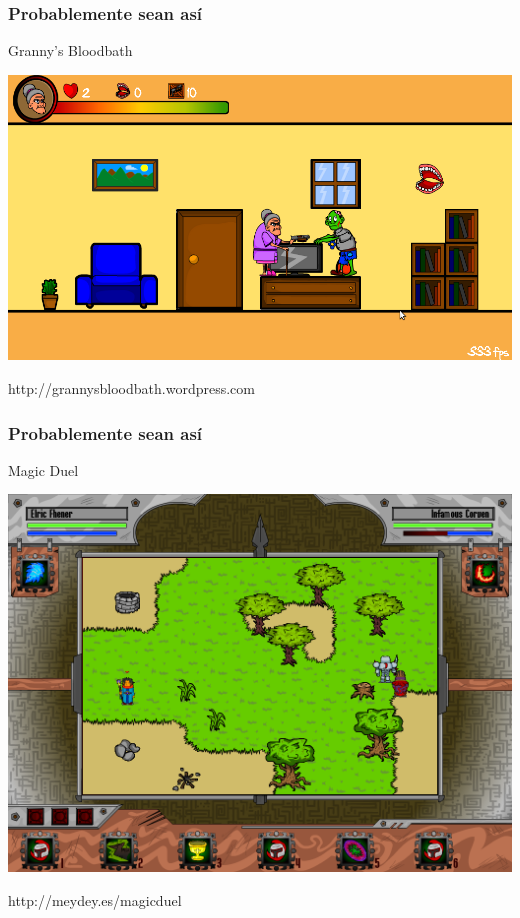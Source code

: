 \begin{frame}
	\frametitle{Probablemente sean así}

	\begin{center}
	Granny's Bloodbath
	
	    \includegraphics[scale=0.26]{img/grannysbloodbath.png}
	    
	http://grannysbloodbath.wordpress.com
	\end{center}
\end{frame}

\begin{frame}
	\frametitle{Probablemente sean así}

	\begin{center}
	Magic Duel
	
	    \includegraphics[scale=0.22]{img/magicduel.png}
	    
	http://meydey.es/magicduel
	\end{center}
\end{frame}

